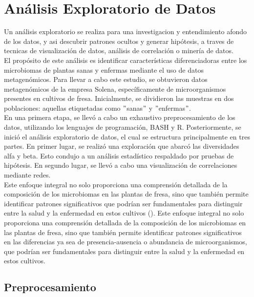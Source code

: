 \chapter{Análisis Exploratorio de Datos}

Un análisis exploratorio se realiza para una investigacion y entendimiento afondo de los datos, y asi descubrir patrones ocultos y generar hipótesis, a traves de tecnicas de visualización de datos, análisis de correlación o minería de datos.\\

El propósito de este análisis es identificar características diferenciadoras entre los microbiomas de plantas sanas y enfermas mediante el uso de datos metagenómicos. Para llevar a cabo este estudio, se obtuvieron datos metagenómicos de la empresa Solena, específicamente de microorganismos presentes en cultivos de fresa. Inicialmente, se dividieron las muestras en dos poblaciones: aquellas etiquetadas como $"$sanas$"$ y $"$enfermas$"$.\\

En una primera etapa, se llevó a cabo un exhaustivo preprocesamiento de los datos, utilizando los lenguajes de programación, BASH y R. Posteriormente, se inició el análisis exploratorio de datos, el cual se estructura principalmente en tres partes. En primer lugar, se realizó una exploración que abarcó las diversidades alfa y beta. Esto condujo a un análisis estadístico respaldado por pruebas de hipótesis. En segundo lugar, se llevó a cabo una visualización de correlaciones mediante redes.\\ %

Este enfoque integral no solo proporciona una comprensión detallada de la composición de los microbiomas en las plantas de fresa, sino que también permite identificar patrones significativos que podrían ser fundamentales para distinguir entre la salud y la enfermedad en estos cultivos (\cite{yang2020}). 
Este enfoque integral no solo proporciona una comprensión detallada de la composición de los microbiomas en las plantas de fresa, sino que también permite identificar patrones significativos en las diferencias ya sea de presencia-ausencia o abundancia de microorganismos, que podrían ser fundamentales para distinguir entre la salud y la enfermedad en estos cultivos.

\section{Preprocesamiento}

